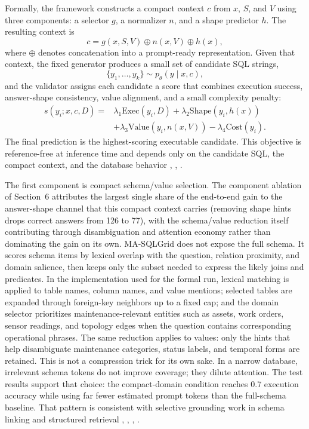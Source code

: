 \documentclass{ieeeaccess}
\begin{document}
Formally, the framework constructs a compact context \(c\) from \(x\), \(S\), and \(V\) using three components: a selector \(g\), a normalizer \(n\), and a shape predictor \(h\). The resulting context is \[
c = g(x,S,V) \oplus n(x,V) \oplus h(x),
\] where \(\oplus\) denotes concatenation into a prompt-ready representation. Given that context, the fixed generator produces a small set of candidate SQL strings, \[
\{y_1,\dots,y_k\} \sim p_\theta(y \mid x,c),
\] and the validator assigns each candidate a score that combines execution success, answer-shape consistency, value alignment, and a small complexity penalty:
\[
\begin{aligned}
s(y_i; x,c,D) ={}& \lambda_1 \mathrm{Exec}(y_i,D)
 + \lambda_2 \mathrm{Shape}(y_i,h(x)) \\
& + \lambda_3 \mathrm{Value}(y_i,n(x,V))
 - \lambda_4 \mathrm{Cost}(y_i).
\end{aligned}
\] The final prediction is the highest-scoring executable candidate. This objective is reference-free at inference time and depends only on the candidate SQL, the compact context, and the database behavior \cite{zhong2020semantic}, \cite{beyer2022verification}, \cite{huang2024survey}.

The first component is compact schema/value selection. The component ablation of Section~6 attributes the largest single share of the end-to-end gain to the answer-shape channel that this compact context carries (removing shape hints drops correct answers from 126 to 77), with the schema/value reduction itself contributing through disambiguation and attention economy rather than dominating the gain on its own. MA-SQLGrid does not expose the full schema. It scores schema items by lexical overlap with the question, relation proximity, and domain salience, then keeps only the subset needed to express the likely joins and predicates. In the implementation used for the formal run, lexical matching is applied to table names, column names, and value mentions; selected tables are expanded through foreign-key neighbors up to a fixed cap; and the domain selector prioritizes maintenance-relevant entities such as assets, work orders, sensor readings, and topology edges when the question contains corresponding operational phrases. The same reduction applies to values: only the hints that help disambiguate maintenance categories, status labels, and temporal forms are retained. This is not a compression trick for its own sake. In a narrow database, irrelevant schema tokens do not improve coverage; they dilute attention. The test results support that choice: the compact-domain condition reaches 0.7 execution accuracy while using far fewer estimated prompt tokens than the full-schema baseline. That pattern is consistent with selective grounding work in schema linking and structured retrieval \cite{lei2020reexamining}, \cite{lin2020bridging}, \cite{quamar2022natural}, \cite{xie2022unifiedskg}.
\end{document}

